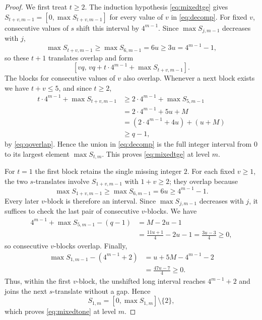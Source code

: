 \documentclass[12pt]{article}
\theoremstyle{plain}
\theoremstyle{definition}
\theoremstyle{plain}
\begin{document}
\begin{proof}
We first treat $t\geq2$.  The induction hypothesis
\eqref{eq:mixedtge} gives $S_{t+v,m-1}=[0,\max S_{t+v,m-1}]$ for every
value of $v$ in \eqref{eq:decomp}.  For fixed $v$, consecutive values of
$s$ shift this interval by $4^{m-1}$.  Since $\max S_{j,m-1}$ decreases
with $j$,
\[
 \max S_{t+v,m-1}\geq\max S_{6,m-1}=6u
     \geq3u=4^{m-1}-1,
\]
so these $t+1$ translates overlap and form
\[
 [vq,\,vq+t\cdot4^{m-1}+\max S_{t+v,m-1}].
\]
The blocks for consecutive values of $v$ also overlap.  Whenever a next
block exists we have $t+v\leq5$, and since $t\geq2$,
\[
\begin{aligned}
 t\cdot4^{m-1}+\max S_{t+v,m-1}
 &\geq2\cdot4^{m-1}+\max S_{5,m-1}\\
 &=2\cdot4^{m-1}+5u+M\\
 &=(2\cdot4^{m-1}+4u)+(u+M)\\
 &\geq q-1,
\end{aligned}
\]
by \eqref{eq:qoverlap}.  Hence the union in \eqref{eq:decomp} is the
full integer interval from $0$ to its largest element $\max S_{t,m}$.
This proves \eqref{eq:mixedtge} at level $m$.

For $t=1$ the first block retains the single missing integer $2$.  For
each fixed $v\geq1$, the two $s$-translates involve $S_{1+v,m-1}$ with
$1+v\geq2$; they overlap because
\[
 \max S_{1+v,m-1}\geq\max S_{6,m-1}=6u\geq4^{m-1}-1.
\]
Every later $v$-block is therefore an interval.  Since $\max S_{j,m-1}$
decreases with $j$, it suffices to check the last pair of consecutive
$v$-blocks.  We have
\[
\begin{aligned}
 4^{m-1}+\max S_{5,m-1}-(q-1)
 &=M-2u-1\\
 &=\frac{11u+1}{4}-2u-1
  =\frac{3u-3}{4}\geq0,
\end{aligned}
\]
so consecutive $v$-blocks overlap.  Finally,
\[
\begin{aligned}
 \max S_{1,m-1}-(4^{m-1}+2)
 &=u+5M-4^{m-1}-2\\
 &=\frac{47u-7}{4}\geq0.
\end{aligned}
\]
Thus, within the first $v$-block, the unshifted long interval reaches
$4^{m-1}+2$ and joins the next $s$-translate without a gap.  Hence
\[
 S_{1,m}=[0,\max S_{1,m}]\setminus\{2\},
\]
which proves \eqref{eq:mixedtone} at level $m$.


\end{proof}
\end{document}
